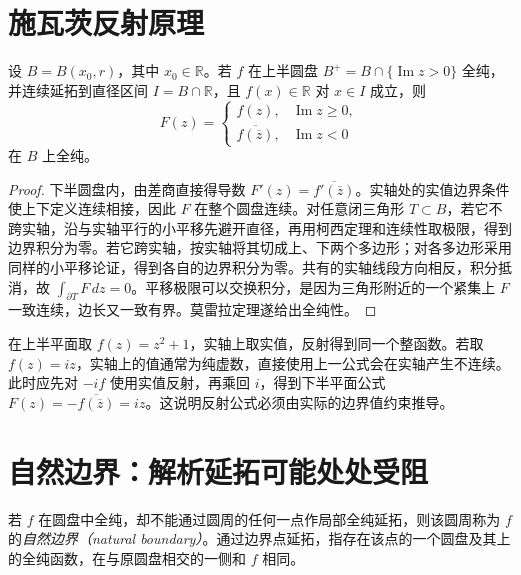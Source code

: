 \section{施瓦茨反射原理}

\begin{theorem}
\label{thm:ca-reflection}
设 $B=B(x_0,r)$，其中 $x_0\in\mathbb R$。若 $f$ 在上半圆盘 $B^+=B\cap\{\operatorname{Im}z>0\}$ 全纯，并连续延拓到直径区间 $I=B\cap\mathbb R$，且 $f(x)\in\mathbb R$ 对 $x\in I$ 成立，则
\[
 F(z)=\begin{cases}
 f(z),&\operatorname{Im}z\ge0,\\
 \overline{f(\overline z)},&\operatorname{Im}z<0
 \end{cases}
\]
在 $B$ 上全纯。
\end{theorem}
\begin{proof}
下半圆盘内，由差商直接得导数 $F'(z)=\overline{f'(\overline z)}$。实轴处的实值边界条件使上下定义连续相接，因此 $F$ 在整个圆盘连续。对任意闭三角形 $T\subset B$，若它不跨实轴，沿与实轴平行的小平移先避开直径，再用柯西定理和连续性取极限，得到边界积分为零。若它跨实轴，按实轴将其切成上、下两个多边形；对各多边形采用同样的小平移论证，得到各自的边界积分为零。共有的实轴线段方向相反，积分抵消，故 $\int_{\partial T}F\,dz=0$。平移极限可以交换积分，是因为三角形附近的一个紧集上 $F$ 一致连续，边长又一致有界。莫雷拉定理遂给出全纯性。
\end{proof}

\begin{example}[边界条件决定反射方式]
在上半平面取 $f(z)=z^2+1$，实轴上取实值，反射得到同一个整函数。若取 $f(z)=iz$，实轴上的值通常为纯虚数，直接使用上一公式会在实轴产生不连续。此时应先对 $-if$ 使用实值反射，再乘回 $i$，得到下半平面公式 $F(z)=-\overline{f(\overline z)}=iz$。这说明反射公式必须由实际的边界值约束推导。
\end{example}

\section{自然边界：解析延拓可能处处受阻}

\begin{definition}[自然边界]
若 $f$ 在圆盘中全纯，却不能通过圆周的任何一点作局部全纯延拓，则该圆周称为 $f$ 的\emph{自然边界（natural boundary）}。通过边界点延拓，指存在该点的一个圆盘及其上的全纯函数，在与原圆盘相交的一侧和 $f$ 相同。
\end{definition}

